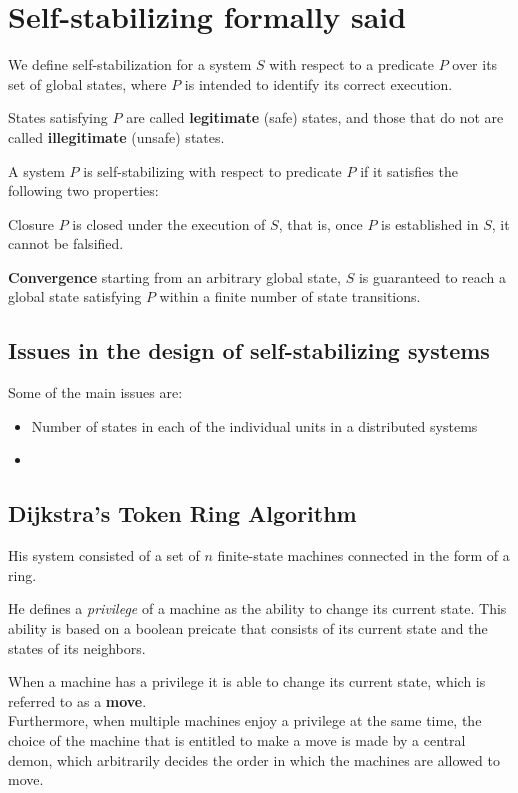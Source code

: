 \section{Self-stabilizing formally said}
We define self-stabilization for a system $S$ with respect to a predicate $P$ over its set of global states, where $P$ is intended to identify its correct execution.

States satisfying $P$ are called \textbf{legitimate} (safe) states, and those that do not are called \textbf{illegitimate} (unsafe) states.

A system $P$ is self-stabilizing with respect to predicate $P$ if it satisfies the following two properties:

Closure $P$ is closed under the execution of $S$, that is, once $P$ is established in $S$, it cannot be falsified.

\textbf{Convergence} starting from an arbitrary global state, $S$ is guaranteed to reach a global state satisfying $P$ within a finite number of state transitions.


\subsection{Issues in the design of self-stabilizing systems}
Some of the main issues are:
\begin{itemize}
   \item Number of states in each of the individual units in a distributed systems
   \item %
\end{itemize}

\subsection{Dijkstra's Token Ring Algorithm}
His system consisted of a set of $n$ finite-state machines connected in the form of a ring.

He defines a \textit{privilege} of a machine as the ability to change its current state.
This ability is based on a boolean preicate that consists of its current state and the states of its neighbors.

When a machine has a privilege it is able to change its current state, which is referred to as a \textbf{move}.\\
Furthermore, when multiple machines enjoy a privilege at the same time, the choice of the machine that is entitled to make a move is made by a central demon, which arbitrarily decides the order in which the machines are allowed to move.


